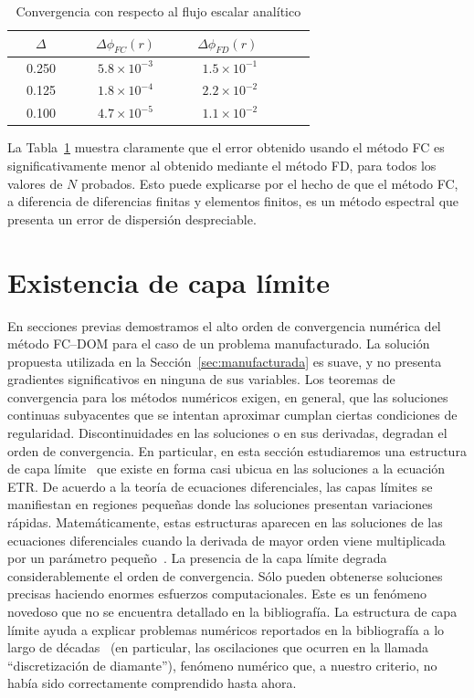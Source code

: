 \begin{table}[h!]
\caption{Convergencia con respecto al flujo escalar analítico} 
\vspace{-0.3cm}
\begin{center}
\begin{tabular}{ccccc}
\hline
  ~~$\Delta$~~  &  ~~$\Delta \phi_{FC}(r)$~~   &   ~~$\Delta \phi_{FD}(r)$ ~~ \\
\hline
 ~~0.250~~   &  ~~$5.8\times 10^{-3}$~~  &  ~~$1.5\times 10^{-1}$~~   \\
 ~~0.125~~   &  ~~$1.8\times 10^{-4}$~~  &  ~~$2.2\times 10^{-2}$~~   \\
 ~~0.100~~   &  ~~$4.7\times 10^{-5}$~~  &  ~~$1.1\times 10^{-2}$~~    \\
\hline
\end{tabular}
\label{tab:convFCanalytic}
\end{center}
\end{table}
La Tabla~\ref{tab:convFCanalytic} muestra claramente que el error obtenido 
usando el método FC es significativamente menor al obtenido mediante el método FD, 
para todos los valores de $N$ probados. 
Esto puede explicarse por el hecho de que el método FC, a diferencia de 
diferencias finitas y elementos finitos, es un método espectral que presenta un error 
de dispersión despreciable.

\section{Existencia de capa límite}
\label{sec:blayer}
En secciones previas demostramos el alto orden de convergencia numérica 
del método FC--DOM para el caso de un problema manufacturado.
La solución propuesta utilizada en la Sección~\ref{sec:manufacturada}
es suave, y no presenta gradientes significativos en ninguna de sus variables. 
Los teoremas de convergencia para los métodos numéricos exigen, en general,  
que las soluciones continuas subyacentes que se intentan aproximar cumplan 
ciertas condiciones de regularidad. Discontinuidades en las soluciones 
o en sus derivadas, degradan el orden de convergencia.
En particular, en esta sección estudiaremos 
una estructura de capa límite~\cite{Gaggioli2021} que existe en forma casi ubicua en las soluciones 
a la ecuación ETR. De acuerdo a la teoría de ecuaciones diferenciales, 
las capas límites se manifiestan en 
regiones  pequeñas donde las soluciones 
presentan variaciones rápidas. Matemáticamente, estas estructuras 
aparecen en las soluciones de las ecuaciones 
diferenciales cuando la derivada de mayor orden 
viene multiplicada por un parámetro 
pequeño~\cite[Cap. 9]{Bender1999}.
La presencia de la capa límite degrada considerablemente el orden de convergencia. 
Sólo pueden obtenerse soluciones precisas haciendo enormes esfuerzos computacionales. 
 Este es un fenómeno novedoso que no 
se encuentra detallado en la bibliografía.  La estructura 
de capa límite ayuda a explicar problemas numéricos reportados en la bibliografía 
a lo largo de décadas~\cite{Case1967,Lewis1984,Petrovic1996,Bal2001,Hunter2015}  
(en particular, las oscilaciones que ocurren en la llamada 
``discretización de diamante''), fenómeno numérico que, a nuestro 
criterio, no había sido correctamente comprendido hasta ahora.


